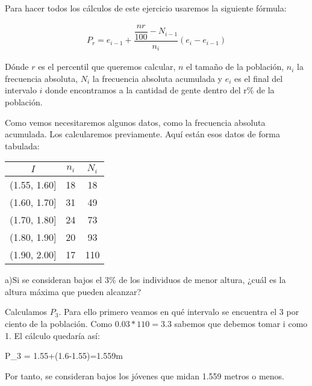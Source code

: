 Para hacer todos los cálculos de este ejercicio usaremos la siguiente fórmula:

\begin{gather}\tag{Percentil}
    P_{r} = e_{i-1}+\dfrac{\dfrac{nr}{100}-N_{i-1}}{n_{i}}(e_{i}-e_{i-1})
\end{gather}

Dónde $r$ es el percentil que queremos calcular, $n$ el tamaño de la población, $n_{i}$ la frecuencia absoluta, $N_{i}$ la frecuencia absoluta acumulada y $e_{i}$ es el final del intervalo $i$ donde encontramos a la cantidad de gente dentro del r\% de la población.

Como vemos necesitaremos algunos datos, como la frecuencia absoluta acumulada. Los calcularemos previamente. Aquí están esos datos de forma tabulada:

\begin{center}
	\begin{table}[htbp]
		\begin{center}
			\begin{tabular}{|c|c|c|}
				\hline
				$I$ & $n_{i}$ & $N_{i}$\\\hline
				(1.55, 1.60] & 18 & 18 \\ \hline
				(1.60, 1.70] & 31 & 49 \\ \hline
				(1.70, 1.80] & 24 & 73 \\ \hline
				(1.80, 1.90] & 20 & 93 \\ \hline
				(1.90, 2.00] & 17 & 110 \\ \hline
			\end{tabular}
		\end{center}
	\end{table}
\end{center}

a)Si se consideran bajos el 3\% de los individuos de menor altura, ¿cuál es la altura máxima que pueden alcanzar?

Calculamos $P_{3}$. Para ello primero veamos en qué intervalo se encuentra el 3 por ciento de la población. Como $0.03*110=3.3$ sabemos que debemos tomar i como 1. El cálculo quedaría así:
\\
\begin{center}
    \begin{*gather}
        P_{3} = 1.55+(1.6-1.55)=1.559m
    \end{*gather}
\end{center}

Por tanto, se consideran bajos los jóvenes que midan 1.559 metros o menos.

